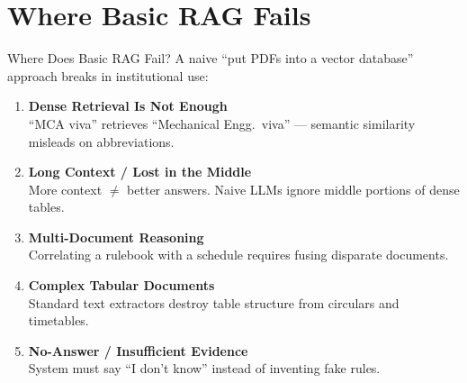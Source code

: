 \documentclass[11pt]{beamer}
\begin{document}
\section{Where Basic RAG Fails}
\begin{frame}{Where Does Basic RAG Fail?}
    A naive ``put PDFs into a vector database'' approach breaks in institutional use:
    \vspace{4pt}
    \begin{enumerate}
        \item \textbf{Dense Retrieval Is Not Enough}\\
        \small ``MCA viva'' retrieves ``Mechanical Engg.\ viva'' --- semantic similarity misleads on abbreviations.
        \vspace{3pt}
        \item \textbf{Long Context / Lost in the Middle}\\
        \small More context $\neq$ better answers. Naive LLMs ignore middle portions of dense tables.
        \vspace{3pt}
        \item \textbf{Multi-Document Reasoning}\\
        \small Correlating a rulebook with a schedule requires fusing disparate documents.
        \vspace{3pt}
        \item \textbf{Complex Tabular Documents}\\
        \small Standard text extractors destroy table structure from circulars and timetables.
        \vspace{3pt}
        \item \textbf{No-Answer / Insufficient Evidence}\\
        \small System must say ``I don't know'' instead of inventing fake rules.
    \end{enumerate}
\end{frame}
\end{document}
